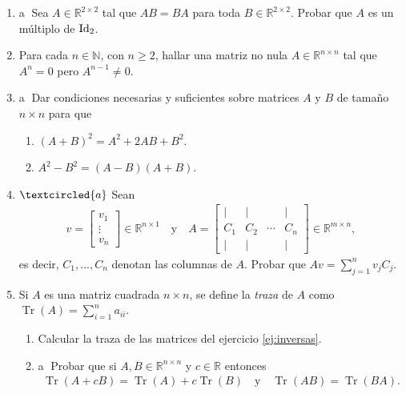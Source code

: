 \begin{enumerate}[topsep=6pt,itemsep=.4cm]
\item\label{2x2 central} \textcircled{a} Sea $A \in\mathbb{R}^{2\times 2}$ tal que $AB=BA$ para toda $B\in\mathbb{R}^{2\times 2}$. Probar que $A$ es un múltiplo de $\operatorname{Id}_2$.


\item  Para cada $n\in\mathbb{N}$, con $n\geq 2$, hallar una matriz no nula $A\in\mathbb{R}^{n\times n}$ tal que $A^n=0$ pero $A^{n-1}\neq0$.


\item\label{eq:binomio} \textcircled{a} Dar condiciones necesarias y suficientes sobre matrices $A$ y $B$ de tama\~{n}o $n\times n$ para que
\begin{multicols}{2}
    \begin{enumerate}
        \item $(A + B)^2 = A^2 + 2AB + B^2$.
        \item $A^2 - B^2 = (A - B)(A + B)$.
    \end{enumerate}
\end{multicols}


\item\label{ej:multiplicar por columna} $\textcircled{a}$ Sean
\begin{align*}
v=\begin{bmatrix} v_1 \\ \vdots \\ v_n
\end{bmatrix}\in\mathbb{R}^{n\times1}
\quad\mbox{y}\quad A=\begin{bmatrix} \mid& \mid& &\mid\\ C_1 & C_2 & \cdots &C_n\\ \mid& \mid& &\mid\end{bmatrix}
\in\mathbb{R}^{m\times n},
\end{align*}
es decir, $C_1, ..., C_n$ denotan las columnas de $A$. Probar que $Av=\sum_{j=1}^nv_jC_j$.


\item\label{traza} Si $A$ es una matriz cuadrada $n\times n$, se define la {\it \textit{traza}} de $A$
como $\operatorname{Tr}(A)=\displaystyle{\sum_{i=1}^n} a_{ii}$.
\begin{enumerate}[topsep=5pt,itemsep=5pt]
 \item Calcular la traza de las matrices del ejercicio  \ref{ej:inversas}.
 \item\label{ej:traza}\textcircled{a} Probar que si $A,B\in\mathbb{R}^{n\times n}$ y $c\in\mathbb{R}$ entonces
 \begin{align*}
 \operatorname{Tr}(A+cB)=\operatorname{Tr}(A)+c\operatorname{Tr}(B)
 \quad\mbox{y}\quad
 \operatorname{Tr}(AB)=\operatorname{Tr}(BA).
 \end{align*}
\end{enumerate}


\end{enumerate}
